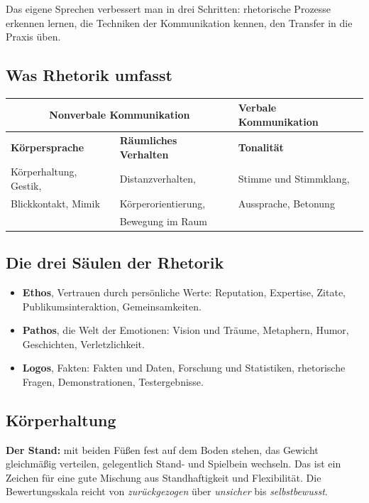 \documentclass[12pt, a4paper]{article}
\begin{document}
Das eigene Sprechen verbessert man in drei Schritten: rhetorische Prozesse
erkennen lernen, die Techniken der Kommunikation kennen, den Transfer in die
Praxis üben.

\subsection{Was Rhetorik umfasst}

\begin{center}
\begin{tabular}{lll}
\multicolumn{2}{c}{\textbf{Nonverbale Kommunikation}} &
\textbf{Verbale Kommunikation}\\\hline
\textbf{Körpersprache} & \textbf{Räumliches Verhalten} & \textbf{Tonalität}\\
Körperhaltung, Gestik, & Distanzverhalten, & Stimme und Stimmklang,\\
Blickkontakt, Mimik & Körperorientierung, & Aussprache, Betonung\\
 & Bewegung im Raum & \\
\end{tabular}
\end{center}

\subsection{Die drei Säulen der Rhetorik}

\begin{itemize}
  \item \textbf{Ethos}, Vertrauen durch persönliche Werte: Reputation,
        Expertise, Zitate, Publikumsinteraktion, Gemeinsamkeiten.
  \item \textbf{Pathos}, die Welt der Emotionen: Vision und Träume,
        Metaphern, Humor, Geschichten, Verletzlichkeit.
  \item \textbf{Logos}, Fakten: Fakten und Daten, Forschung und Statistiken,
        rhetorische Fragen, Demonstrationen, Testergebnisse.
\end{itemize}

\subsection{Körperhaltung}

\textbf{Der Stand:} mit beiden Füßen fest auf dem Boden stehen, das Gewicht
gleichmäßig verteilen, gelegentlich Stand- und Spielbein wechseln. Das ist
ein Zeichen für eine gute Mischung aus Standhaftigkeit und Flexibilität. Die
Bewertungsskala reicht von \emph{zurückgezogen} über \emph{unsicher} bis
\emph{selbstbewusst}.
\end{document}

